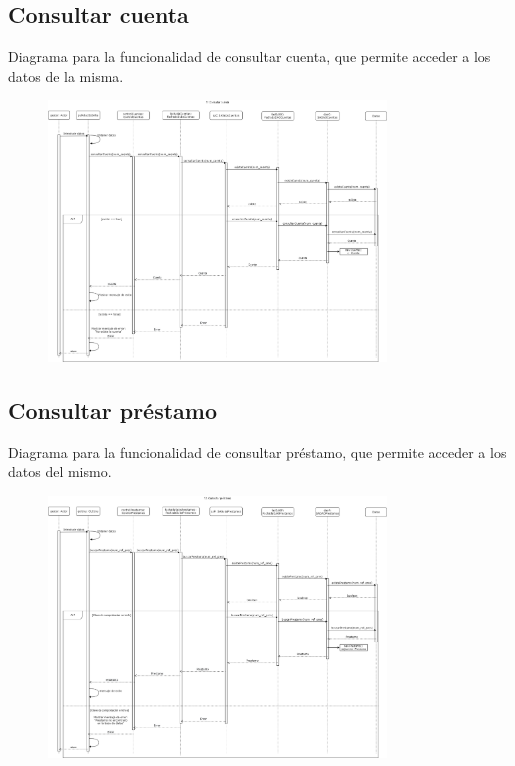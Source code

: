 \documentclass[12pt]{article}
\begin{document}
\subsection{Consultar cuenta}
Diagrama para la funcionalidad de consultar cuenta, que permite acceder a los datos de la misma.
\begin{figure}[H]
    \centering
    \includegraphics[width=0.8\textwidth]{images/ConsultaCuenta.png}
\end{figure}
\subsection{Consultar préstamo}
Diagrama para la funcionalidad de consultar préstamo, que permite acceder a los datos del mismo.
\begin{figure}[H]
    \centering
    \includegraphics[width=0.8\textwidth]{images/consultar_prestamo.png}
\end{figure}
\newpage
\end{document}
